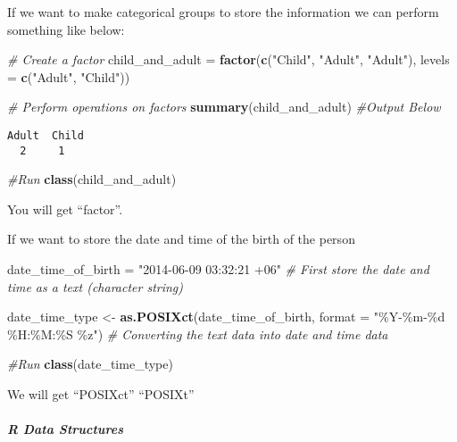 \documentclass[
]{article}
\newenvironment{Shaded}{\begin{snugshade}}{\end{snugshade}}
\newcommand{\AttributeTok}[1]{\textcolor[rgb]{0.13,0.29,0.53}{#1}}
\newcommand{\CommentTok}[1]{\textcolor[rgb]{0.56,0.35,0.01}{\textit{#1}}}
\newcommand{\FunctionTok}[1]{\textcolor[rgb]{0.13,0.29,0.53}{\textbf{#1}}}
\newcommand{\NormalTok}[1]{#1}
\newcommand{\OtherTok}[1]{\textcolor[rgb]{0.56,0.35,0.01}{#1}}
\newcommand{\StringTok}[1]{\textcolor[rgb]{0.31,0.60,0.02}{#1}}
\begin{document}
If we want to make categorical groups to store the information we can
perform something like below:

\begin{Shaded}
\begin{Highlighting}[]
\CommentTok{\# Create a factor}
\NormalTok{child\_and\_adult }\OtherTok{=} \FunctionTok{factor}\NormalTok{(}\FunctionTok{c}\NormalTok{(}\StringTok{"Child"}\NormalTok{, }\StringTok{"Adult"}\NormalTok{, }\StringTok{"Adult"}\NormalTok{), }\AttributeTok{levels =} \FunctionTok{c}\NormalTok{(}\StringTok{"Adult"}\NormalTok{, }\StringTok{"Child"}\NormalTok{))}

\CommentTok{\# Perform operations on factors}
\FunctionTok{summary}\NormalTok{(child\_and\_adult) }\CommentTok{\#Output Below}
\end{Highlighting}
\end{Shaded}

\begin{verbatim}
Adult  Child
  2     1
\end{verbatim}

\begin{Shaded}
\begin{Highlighting}[]
\CommentTok{\#Run }
\FunctionTok{class}\NormalTok{(child\_and\_adult)}
\end{Highlighting}
\end{Shaded}

You will get ``factor''.

If we want to store the date and time of the birth of the person

\begin{Shaded}
\begin{Highlighting}[]
\NormalTok{date\_time\_of\_birth }\OtherTok{=} \StringTok{"2014{-}06{-}09 03:32:21 +06"} \CommentTok{\# First store the date and time as a text (character string)}

\NormalTok{date\_time\_type }\OtherTok{\textless{}{-}} \FunctionTok{as.POSIXct}\NormalTok{(date\_time\_of\_birth, }\AttributeTok{format =} \StringTok{"\%Y{-}\%m{-}\%d \%H:\%M:\%S \%z"}\NormalTok{) }\CommentTok{\# Converting the text data into date and time data}

\CommentTok{\#Run }
\FunctionTok{class}\NormalTok{(date\_time\_type)}
\end{Highlighting}
\end{Shaded}

We will get ``POSIXct'' ``POSIXt''

\hypertarget{r-data-structures}{%
\subparagraph{R Data Structures}\label{r-data-structures}}
\end{document}

